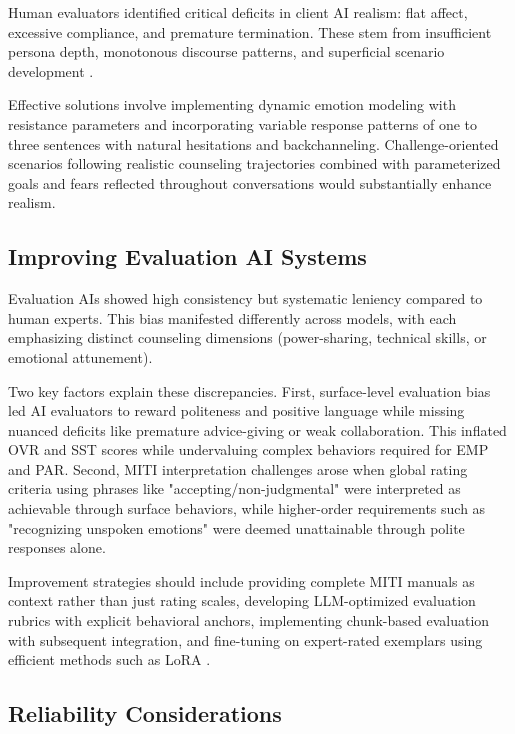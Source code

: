 \documentclass{wiley-article}
\begin{document}
Human evaluators identified critical deficits in client AI realism: flat affect, excessive compliance, and premature termination. These stem from insufficient persona depth, monotonous discourse patterns, and superficial scenario development \citep{mauryaQualitativeContentAnalysis2024, qiuInteractiveAgentsSimulating2024}.

Effective solutions involve implementing dynamic emotion modeling with resistance parameters \citep{baoSFMSSServiceFlow2025} and incorporating variable response patterns of one to three sentences with natural hesitations and backchanneling. Challenge-oriented scenarios following realistic counseling trajectories \citep{duLLMsCanSimulate2024} combined with parameterized goals and fears reflected throughout conversations \citep{cookVirtualPatientsUsing2025} would substantially enhance realism.

\subsection*{Improving Evaluation AI Systems}

Evaluation AIs showed high consistency but systematic leniency compared to human experts. This bias manifested differently across models, with each emphasizing distinct counseling dimensions (power-sharing, technical skills, or emotional attunement).

Two key factors explain these discrepancies. First, surface-level evaluation bias led AI evaluators to reward politeness and positive language while missing nuanced deficits like premature advice-giving or weak collaboration. This inflated OVR and SST scores while undervaluing complex behaviors required for EMP and PAR. Second, MITI interpretation challenges arose when global rating criteria using phrases like "accepting/non-judgmental" were interpreted as achievable through surface behaviors, while higher-order requirements such as "recognizing unspoken emotions" were deemed unattainable through polite responses alone.

Improvement strategies should include providing complete MITI manuals as context rather than just rating scales, developing LLM-optimized evaluation rubrics with explicit behavioral anchors, implementing chunk-based evaluation with subsequent integration, and fine-tuning on expert-rated exemplars using efficient methods such as LoRA \citep{zhangPLaDPreferencebasedLarge2024}.

\subsection*{Reliability Considerations}
\end{document}
